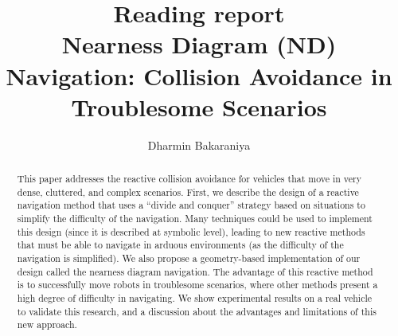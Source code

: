 \documentclass[12pt]{article}
\title{Reading report\\ Nearness Diagram (ND) Navigation: Collision Avoidance in Troublesome Scenarios\cite{minguez2004nearness}}
\author{Dharmin Bakaraniya}
\begin{document}
\maketitle{}

\begin{abstract}
    This paper addresses the reactive collision avoidance
    for vehicles that move in very dense, cluttered, and complex
    scenarios. First, we describe the design of a reactive navigation
    method that uses a “divide and conquer” strategy based on situations to simplify the difficulty of the navigation. Many techniques
    could be used to implement this design (since it is described at
    symbolic level), leading to new reactive methods that must be
    able to navigate in arduous environments (as the difficulty of
    the navigation is simplified). We also propose a geometry-based
    implementation of our design called the nearness diagram navigation. The advantage of this reactive method is to successfully move
    robots in troublesome scenarios, where other methods present
    a high degree of difficulty in navigating. We show experimental
    results on a real vehicle to validate this research, and a discussion
    about the advantages and limitations of this new approach.
\end{abstract}
\end{document}

